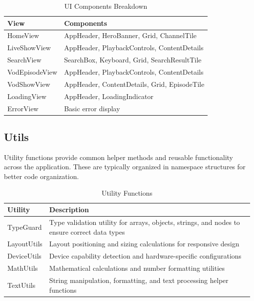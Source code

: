 \documentclass[11pt,letterpaper]{article}
\begin{document}
\begin{table}[H]
\centering
\scriptsize
\begin{tabular}{@{}p{}p{}@{}}
\toprule
\textbf{View} & \textbf{Components} \\
\midrule
HomeView & AppHeader, HeroBanner, Grid, ChannelTile \\
LiveShowView & AppHeader, PlaybackControls, ContentDetails \\
SearchView & SearchBox, Keyboard, Grid, SearchResultTile \\
VodEpisodeView & AppHeader, PlaybackControls, ContentDetails \\
VodShowView & AppHeader, ContentDetails, Grid, EpisodeTile \\
LoadingView & AppHeader, LoadingIndicator \\
ErrorView & Basic error display \\
\bottomrule
\end{tabular}
\caption{\small UI Components Breakdown}
\label{tab:ui-components}
\end{table}

\subsection{Utils}
\label{sec:utils}

Utility functions provide common helper methods and reusable functionality across the application. These are typically organized in namespace structures for better code organization.

\begin{table}[H]
\centering
\scriptsize
\begin{tabular}{@{}p{}p{}@{}}
\toprule
\textbf{Utility} & \textbf{Description} \\
\midrule
TypeGuard & Type validation utility for arrays, objects, strings, and nodes to ensure correct data types \\
LayoutUtils & Layout positioning and sizing calculations for responsive design \\
DeviceUtils & Device capability detection and hardware-specific configurations \\
MathUtils & Mathematical calculations and number formatting utilities \\
TextUtils & String manipulation, formatting, and text processing helper functions \\
\bottomrule
\end{tabular}
\caption{\small Utility Functions}
\label{tab:utils}
\end{table}
\end{document}
